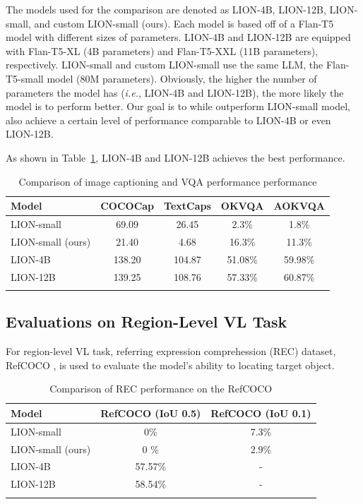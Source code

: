 \documentclass[conference]{IEEEtran}
\begin{document}
The models used for the comparison are denoted as LION-4B, LION-12B, LION-small, and custom LION-small (ours).
Each model is based off of a Flan-T5 model with different sizes of parameters. 
LION-4B and LION-12B are equipped with Flan-T5-XL (4B parameters) and Flan-T5-XXL (11B parameters), respectively.
LION-small and custom LION-small use the same LLM, the Flan-T5-small model (80M parameters).
Obviously, the higher the number of parameters the model has (\textit{i.e.}, LION-4B and LION-12B), the more likely the model is to perform better.
Our goal is to while outperform LION-small model, also achieve a certain level of performance comparable to LION-4B or even LION-12B.

As shown in Table~\ref{tab:image-level}, LION-4B and LION-12B achieves the best performance.


\begin{table}
  \centering
  \caption{Comparison of image captioning and VQA performance performance}
  \begin{tabular}{l|cc|cc}
    \Xhline{2\arrayrulewidth}
    Model & COCOCap & TextCaps & OKVQA & AOKVQA \\
    \hline\hline
    LION-small & 69.09 & 26.45 & 2.3\% & 1.8\% \\
    LION-small (ours) & 21.40 & 4.68 & 16.3\% & 11.3\% \\
    LION-4B & 138.20 & 104.87 & 51.08\% & 59.98\% \\
    LION-12B & 139.25 & 108.76 & 57.33\% & 60.87\% \\
    \Xhline{2\arrayrulewidth}
  \end{tabular}
  \newline
  \label{tab:image-level}
\end{table}


\subsection{Evaluations on Region-Level VL Task}

For region-level VL task, referring expression comprehession (REC) dataset, RefCOCO \cite{refcoco}, is used to evaluate the model's ability to locating target object.

\begin{table}
  \centering
  \caption{Comparison of REC performance on the RefCOCO}
  \begin{tabular}{l | c | c}
    \Xhline{2\arrayrulewidth}
    Model & RefCOCO (IoU 0.5) & RefCOCO (IoU 0.1) \\
    \hline \hline
    LION-small & 0\% & 7.3\% \\
    LION-small (ours) & 0 \% & 2.9\% \\
    LION-4B & 57.57\% & - \\
    LION-12B & 58.54\% & - \\
    \Xhline{2\arrayrulewidth}
  \end{tabular}
  \newline
  \label{tab:region-level}
\end{table}



\end{document}
